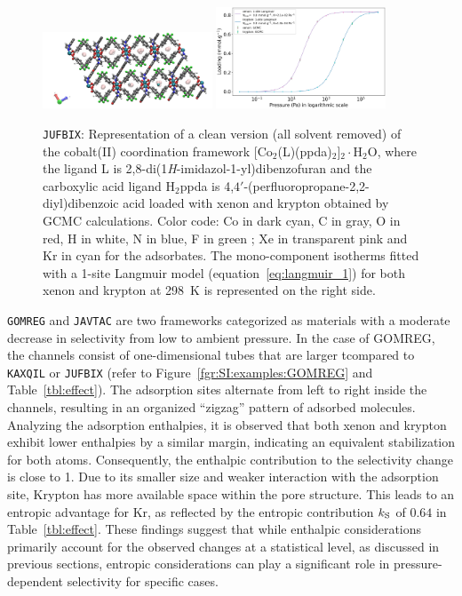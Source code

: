 \documentclass[main.tex]{subfiles}
\begin{document}
\begin{figure}[ht]
  \centering
    \includegraphics[width=0.45\textwidth]{figures/2-thermo/JUFBIX_clean.jpg}
    \includegraphics[width=0.45\textwidth]{figures/2-thermo/JUFBIX_clean_isotherm_xenon_krypton_298K.jpg}
    \caption{\texttt{JUFBIX}: Representation of a clean version (all solvent removed) of the cobalt(II) coordination framework [Co$_2$(L)(ppda)$_2$]$_2\cdot$H$_2$O, where the ligand L is 2,8-di(1\emph{H}-imidazol-1-yl)dibenzofuran and the carboxylic acid ligand H$_2$ppda is 4,$4'$-(perfluoropropane-2,2-diyl)dibenzoic acid loaded with xenon and krypton obtained by GCMC calculations. Color code: Co in dark cyan, C in gray, O in red, H in white, N in blue, F in green ; Xe in transparent pink and Kr in cyan for the adsorbates. The mono-component isotherms fitted with a 1-site Langmuir model (equation~\ref{eq:langmuir_1}) for both xenon and krypton at \SI{298}{\kelvin} is represented on the right side.}\label{fgr:SI:examples:JUFBIX}
  \end{figure}

  \texttt{GOMREG} and \texttt{JAVTAC} are two frameworks categorized as materials with a moderate decrease in selectivity from low to ambient pressure. In the case of GOMREG, the channels consist of one-dimensional tubes that are larger tcompared to \texttt{KAXQIL} or \texttt{JUFBIX} (refer to Figure~\ref{fgr:SI:examples:GOMREG} and Table~\ref{tbl:effect}). The adsorption sites alternate from left to right inside the channels, resulting in an organized ``zigzag'' pattern of adsorbed molecules. Analyzing the adsorption enthalpies, it is observed that both xenon and krypton exhibit lower enthalpies by a similar margin, indicating an equivalent stabilization for both atoms. Consequently, the enthalpic contribution to the selectivity change is close to 1. 
Due to its smaller size and weaker interaction with the adsorption site, Krypton has more available space within the pore structure. This leads to an entropic advantage for Kr, as reflected by the entropic contribution $k_{\text{S}}$ of $0.64$ in Table~\ref{tbl:effect}. These findings suggest that while enthalpic considerations primarily account for the observed changes at a statistical level, as discussed in previous sections, entropic considerations can play a significant role in pressure-dependent selectivity for specific cases.
\end{document}
